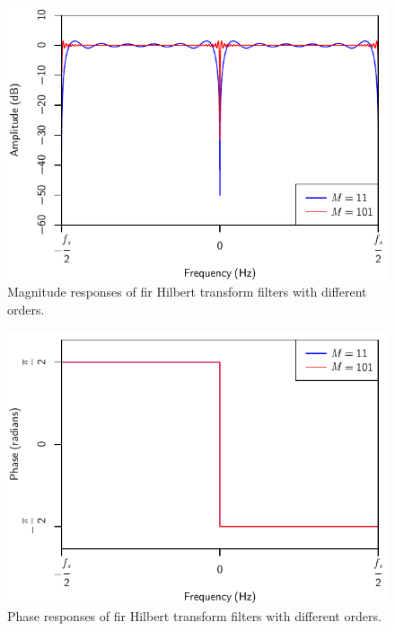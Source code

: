 			\begin{figure}[h!]
				\centering
				\includegraphics{chapter2/Images/HilbertMagnitudeResponses.pdf}
				\caption{Magnitude responses of \acrshort{fir} Hilbert transform filters with different
					 orders.}
				\label{fig:HilbertMagnitude}
			\end{figure}

			\begin{figure}[h!]
				\centering
				\includegraphics{chapter2/Images/HilbertPhaseResponses.pdf}
				\caption{Phase responses of \acrshort{fir} Hilbert transform filters with different
					 orders.}
				\label{fig:HilbertPhase}
			\end{figure}

